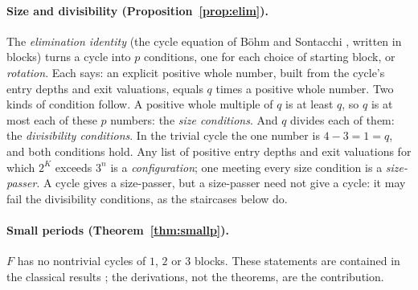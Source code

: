 \documentclass[11pt]{article}
\theoremstyle{remark}
\begin{document}
\paragraph{Size and divisibility (Proposition~\ref{prop:elim}).} The \emph{elimination identity} (the cycle equation of B\"ohm and Sontacchi \cite{bohm}, written in blocks) turns a cycle into $p$ conditions, one for each choice of starting block, or \emph{rotation}. Each says: an explicit positive whole number, built from the cycle's entry depths and exit valuations, equals $q$ times a positive whole number. Two kinds of condition follow. A positive whole multiple of $q$ is at least $q$, so $q$ is at most each of these $p$ numbers: the \emph{size conditions}. And $q$ divides each of them: the \emph{divisibility conditions}. In the trivial cycle the one number is $4 - 3 = 1 = q$, and both conditions hold. Any list of positive entry depths and exit valuations for which $2^K$ exceeds $3^n$ is a \emph{configuration}; one meeting every size condition is a \emph{size-passer}. A cycle gives a size-passer, but a size-passer need not give a cycle: it may fail the divisibility conditions, as the staircases below do.

\paragraph{Small periods (Theorem~\ref{thm:smallp}).} $F$ has no nontrivial cycles of $1$, $2$ or $3$ blocks. These statements are contained in the classical results \cite{steiner,rozier90,sdw,hercher}; the derivations, not the theorems, are the contribution.
\end{document}
